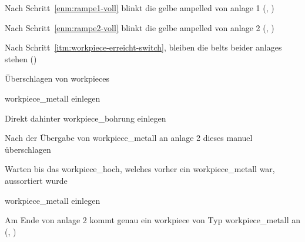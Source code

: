     \begin{erwartung}
        \item Nach Schritt~\ref{enm:rampe1-voll} blinkt die gelbe \gls{ampelled}
        von \gls{anlage} 1 (, ) %
        \item Nach Schritt~\ref{enm:rampe2-voll} blinkt die gelbe \gls{ampelled}
        von \gls{anlage} 2 (, ) %
        \item Nach Schritt~\ref{itm:workpiece-erreicht-switch},
         bleiben die \glspl{belt} beider \glspl{anlage} stehen ()
    \end{erwartung}

    \begin{ablauf}{Überschlagen von \glspl{workpiece}}
        \item \gls{workpiece_metall} einlegen
        \item Direkt dahinter \gls{workpiece_bohrung} einlegen
        \item Nach der Übergabe von \gls{workpiece_metall} an \gls{anlage} 2 dieses manuel überschlagen
        \item Warten bis das \gls{workpiece_hoch}, welches vorher ein \gls{workpiece_metall} war,
        aussortiert wurde
        \item \gls{workpiece_metall} einlegen
    \end{ablauf}

    \erwartungText
    Am Ende von \gls{anlage} 2 kommt genau ein \gls{workpiece} von Typ \gls{workpiece_metall} an (, )
